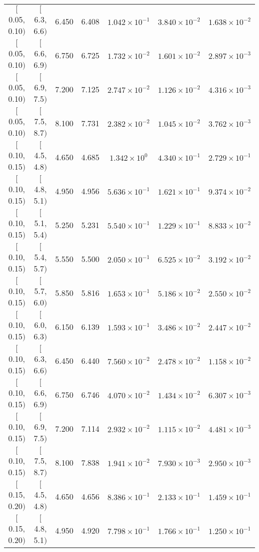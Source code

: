 \begin{longtable}{| c | c | c | c | c | c | c |}
$[$0.05, 0.10$)$ & $[$6.3, 6.6$)$ & 6.450 & 6.408 & $1.042 \times 10^{-1}$ & $3.840 \times 10^{-2}$ & $1.638 \times 10^{-2}$ \\
$[$0.05, 0.10$)$ & $[$6.6, 6.9$)$ & 6.750 & 6.725 & $1.732 \times 10^{-2}$ & $1.601 \times 10^{-2}$ & $2.897 \times 10^{-3}$ \\
$[$0.05, 0.10$)$ & $[$6.9, 7.5$)$ & 7.200 & 7.125 & $2.747 \times 10^{-2}$ & $1.126 \times 10^{-2}$ & $4.316 \times 10^{-3}$ \\
$[$0.05, 0.10$)$ & $[$7.5, 8.7$)$ & 8.100 & 7.731 & $2.382 \times 10^{-2}$ & $1.045 \times 10^{-2}$ & $3.762 \times 10^{-3}$ \\
\hline
$[$0.10, 0.15$)$ & $[$4.5, 4.8$)$ & 4.650 & 4.685 & $1.342 \times 10^{0}$ & $4.340 \times 10^{-1}$ & $2.729 \times 10^{-1}$ \\
$[$0.10, 0.15$)$ & $[$4.8, 5.1$)$ & 4.950 & 4.956 & $5.636 \times 10^{-1}$ & $1.621 \times 10^{-1}$ & $9.374 \times 10^{-2}$ \\
$[$0.10, 0.15$)$ & $[$5.1, 5.4$)$ & 5.250 & 5.231 & $5.540 \times 10^{-1}$ & $1.229 \times 10^{-1}$ & $8.833 \times 10^{-2}$ \\
$[$0.10, 0.15$)$ & $[$5.4, 5.7$)$ & 5.550 & 5.500 & $2.050 \times 10^{-1}$ & $6.525 \times 10^{-2}$ & $3.192 \times 10^{-2}$ \\
$[$0.10, 0.15$)$ & $[$5.7, 6.0$)$ & 5.850 & 5.816 & $1.653 \times 10^{-1}$ & $5.186 \times 10^{-2}$ & $2.550 \times 10^{-2}$ \\
$[$0.10, 0.15$)$ & $[$6.0, 6.3$)$ & 6.150 & 6.139 & $1.593 \times 10^{-1}$ & $3.486 \times 10^{-2}$ & $2.447 \times 10^{-2}$ \\
$[$0.10, 0.15$)$ & $[$6.3, 6.6$)$ & 6.450 & 6.440 & $7.560 \times 10^{-2}$ & $2.478 \times 10^{-2}$ & $1.158 \times 10^{-2}$ \\
$[$0.10, 0.15$)$ & $[$6.6, 6.9$)$ & 6.750 & 6.746 & $4.070 \times 10^{-2}$ & $1.434 \times 10^{-2}$ & $6.307 \times 10^{-3}$ \\
$[$0.10, 0.15$)$ & $[$6.9, 7.5$)$ & 7.200 & 7.114 & $2.932 \times 10^{-2}$ & $1.115 \times 10^{-2}$ & $4.481 \times 10^{-3}$ \\
$[$0.10, 0.15$)$ & $[$7.5, 8.7$)$ & 8.100 & 7.838 & $1.941 \times 10^{-2}$ & $7.930 \times 10^{-3}$ & $2.950 \times 10^{-3}$ \\
\hline
$[$0.15, 0.20$)$ & $[$4.5, 4.8$)$ & 4.650 & 4.656 & $8.386 \times 10^{-1}$ & $2.133 \times 10^{-1}$ & $1.459 \times 10^{-1}$ \\
$[$0.15, 0.20$)$ & $[$4.8, 5.1$)$ & 4.950 & 4.920 & $7.798 \times 10^{-1}$ & $1.766 \times 10^{-1}$ & $1.250 \times 10^{-1}$ \\

\end{longtable}
